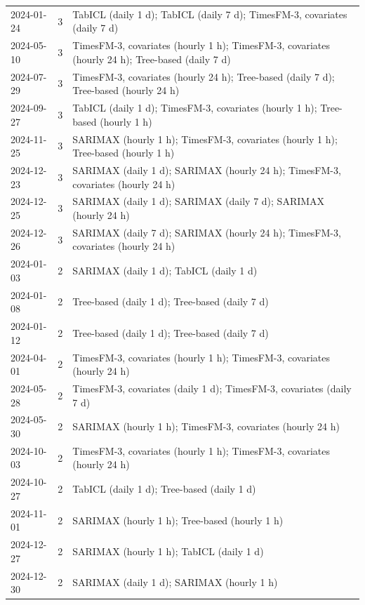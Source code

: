 \begin{tabular}{lrl}
2024-01-24 & 3 & TabICL (daily 1 d); TabICL (daily 7 d); TimesFM-3, covariates (daily 7 d) \\
2024-05-10 & 3 & TimesFM-3, covariates (hourly 1 h); TimesFM-3, covariates (hourly 24 h); Tree-based (daily 7 d) \\
2024-07-29 & 3 & TimesFM-3, covariates (hourly 24 h); Tree-based (daily 7 d); Tree-based (hourly 24 h) \\
2024-09-27 & 3 & TabICL (daily 1 d); TimesFM-3, covariates (hourly 1 h); Tree-based (hourly 1 h) \\
2024-11-25 & 3 & SARIMAX (hourly 1 h); TimesFM-3, covariates (hourly 1 h); Tree-based (hourly 1 h) \\
2024-12-23 & 3 & SARIMAX (daily 1 d); SARIMAX (hourly 24 h); TimesFM-3, covariates (hourly 24 h) \\
2024-12-25 & 3 & SARIMAX (daily 1 d); SARIMAX (daily 7 d); SARIMAX (hourly 24 h) \\
2024-12-26 & 3 & SARIMAX (daily 7 d); SARIMAX (hourly 24 h); TimesFM-3, covariates (hourly 24 h) \\
2024-01-03 & 2 & SARIMAX (daily 1 d); TabICL (daily 1 d) \\
2024-01-08 & 2 & Tree-based (daily 1 d); Tree-based (daily 7 d) \\
2024-01-12 & 2 & Tree-based (daily 1 d); Tree-based (daily 7 d) \\
2024-04-01 & 2 & TimesFM-3, covariates (hourly 1 h); TimesFM-3, covariates (hourly 24 h) \\
2024-05-28 & 2 & TimesFM-3, covariates (daily 1 d); TimesFM-3, covariates (daily 7 d) \\
2024-05-30 & 2 & SARIMAX (hourly 1 h); TimesFM-3, covariates (hourly 24 h) \\
2024-10-03 & 2 & TimesFM-3, covariates (hourly 1 h); TimesFM-3, covariates (hourly 24 h) \\
2024-10-27 & 2 & TabICL (daily 1 d); Tree-based (daily 1 d) \\
2024-11-01 & 2 & SARIMAX (hourly 1 h); Tree-based (hourly 1 h) \\
2024-12-27 & 2 & SARIMAX (hourly 1 h); TabICL (daily 1 d) \\
2024-12-30 & 2 & SARIMAX (daily 1 d); SARIMAX (hourly 1 h) \\
\bottomrule
\end{tabular}
